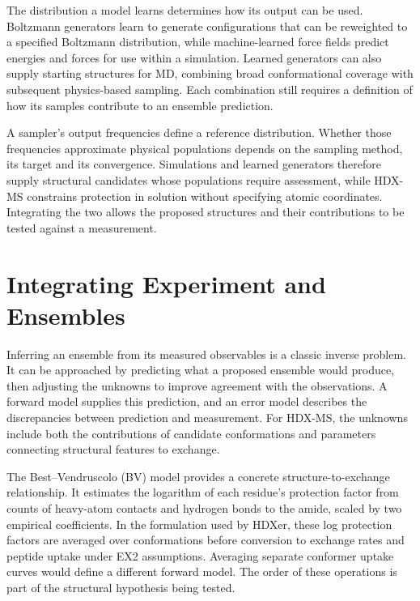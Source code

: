 The distribution a model learns determines how its output can be used. Boltzmann generators learn to generate configurations that can be reweighted to a specified Boltzmann distribution,\supercite{noeBoltzmannGeneratorsSampling2019} while machine-learned force fields predict energies and forces for use within a simulation.\supercite{unkeBiomolecularDynamicsMachinelearned2024} Learned generators can also supply starting structures for MD, combining broad conformational coverage with subsequent physics-based sampling.\supercite{zhengMachineLearningGeneration2023} Each combination still requires a definition of how its samples contribute to an ensemble prediction.

A sampler's output frequencies define a reference distribution. Whether those frequencies approximate physical populations depends on the sampling method, its target and its convergence.\supercite{bmsb2012ch4} Simulations and learned generators therefore supply structural candidates whose populations require assessment, while HDX-MS constrains protection in solution without specifying atomic coordinates. Integrating the two allows the proposed structures and their contributions to be tested against a measurement.

\section{Integrating Experiment and Ensembles}
\label{sec:intro-integration}

Inferring an ensemble from its measured observables is a classic inverse problem. It can be approached by predicting what a proposed ensemble would produce, then adjusting the unknowns to improve agreement with the observations. A forward model supplies this prediction, and an error model describes the discrepancies between prediction and measurement.\supercite{bmsb2012ch12} For HDX-MS, the unknowns include both the contributions of candidate conformations and parameters connecting structural features to exchange.

The Best--Vendruscolo (BV) model provides a concrete structure-to-exchange relationship. It estimates the logarithm of each residue's protection factor from counts of heavy-atom contacts and hydrogen bonds to the amide, scaled by two empirical coefficients.\supercite{bestStructuralInterpretationHydrogen2006} In the formulation used by HDXer, these log protection factors are averaged over conformations before conversion to exchange rates and peptide uptake under EX2 assumptions.\supercite{bradshawInterpretationHDXData2020} Averaging separate conformer uptake curves would define a different forward model. The order of these operations is part of the structural hypothesis being tested.

